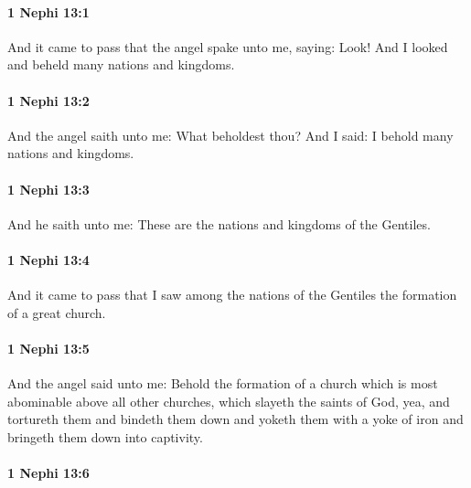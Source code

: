 		\paragraph{1 Nephi 13:1} %
			\label{1NEPHI-13-1}

			And it came to pass that the angel spake unto me, saying: Look!
			And I looked and beheld many nations and kingdoms.

		\paragraph{1 Nephi 13:2} %
			\label{1NEPHI-13-2}

			And the angel saith unto me:
			What beholdest thou?
			And I said:
			I behold many nations and kingdoms.

		\paragraph{1 Nephi 13:3} %
			\label{1NEPHI-13-3}

			And he saith unto me:
			These are the nations and kingdoms of the Gentiles.

		\paragraph{1 Nephi 13:4} %
			\label{1NEPHI-13-4}

			And it came to pass that I saw among the nations of the Gentiles
			the formation of a great church.

		\paragraph{1 Nephi 13:5} %
			\label{1NEPHI-13-5}

			And the angel said unto me:
			Behold the formation of a church
			which is most abominable above all other churches,
			which slayeth the saints of God,
			yea, and tortureth them and bindeth them down
			and yoketh them with a yoke of iron
			and bringeth them down into captivity.

		\paragraph{1 Nephi 13:6} %
			\label{1NEPHI-13-6}

